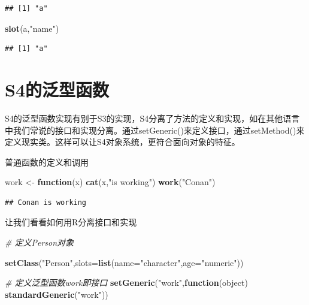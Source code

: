 \documentclass[]{book}
\newenvironment{Shaded}{\begin{snugshade}}{\end{snugshade}}
\newcommand{\KeywordTok}[1]{\textcolor[rgb]{0.13,0.29,0.53}{\textbf{#1}}}
\newcommand{\DataTypeTok}[1]{\textcolor[rgb]{0.13,0.29,0.53}{#1}}
\newcommand{\StringTok}[1]{\textcolor[rgb]{0.31,0.60,0.02}{#1}}
\newcommand{\CommentTok}[1]{\textcolor[rgb]{0.56,0.35,0.01}{\textit{#1}}}
\newcommand{\ControlFlowTok}[1]{\textcolor[rgb]{0.13,0.29,0.53}{\textbf{#1}}}
\newcommand{\NormalTok}[1]{#1}
\begin{document}
\begin{verbatim}
## [1] "a"
\end{verbatim}

\begin{Shaded}
\begin{Highlighting}[]
\KeywordTok{slot}\NormalTok{(a,}\StringTok{"name"}\NormalTok{)}
\end{Highlighting}
\end{Shaded}

\begin{verbatim}
## [1] "a"
\end{verbatim}

\begin{Shaded}
\end{Shaded}

\section{S4的泛型函数}\label{s4}

S4的泛型函数实现有别于S3的实现，S4分离了方法的定义和实现，如在其他语言中我们常说的接口和实现分离。通过setGeneric()来定义接口，通过setMethod()来定义现实类。这样可以让S4对象系统，更符合面向对象的特征。

普通函数的定义和调用

\begin{Shaded}
\begin{Highlighting}[]
\NormalTok{work <-}\StringTok{ }\ControlFlowTok{function}\NormalTok{(x) }\KeywordTok{cat}\NormalTok{(x,}\StringTok{"is working"}\NormalTok{)}
\KeywordTok{work}\NormalTok{(}\StringTok{"Conan"}\NormalTok{)}
\end{Highlighting}
\end{Shaded}

\begin{verbatim}
## Conan is working
\end{verbatim}

让我们看看如何用R分离接口和实现

\begin{Shaded}
\begin{Highlighting}[]
\CommentTok{# 定义Person对象}

\KeywordTok{setClass}\NormalTok{(}\StringTok{"Person"}\NormalTok{,}\DataTypeTok{slots=}\KeywordTok{list}\NormalTok{(}\DataTypeTok{name=}\StringTok{"character"}\NormalTok{,}\DataTypeTok{age=}\StringTok{"numeric"}\NormalTok{))}

\CommentTok{# 定义泛型函数work即接口}
\KeywordTok{setGeneric}\NormalTok{(}\StringTok{"work"}\NormalTok{,}\ControlFlowTok{function}\NormalTok{(object) }\KeywordTok{standardGeneric}\NormalTok{(}\StringTok{"work"}\NormalTok{))}
\end{Highlighting}
\end{Shaded}
\end{document}
